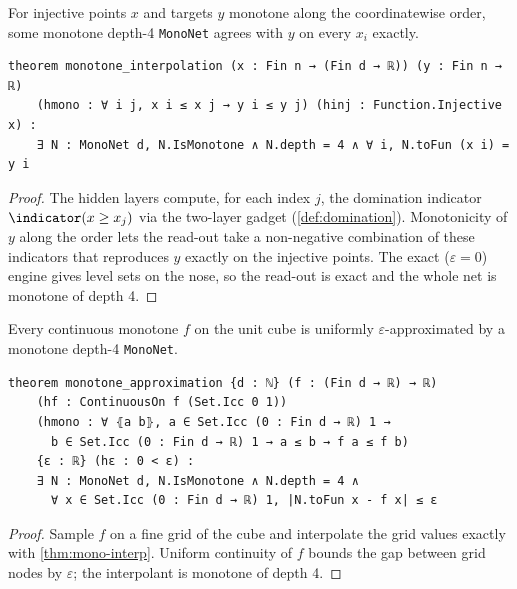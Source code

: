 \begin{theorem}\label{thm:mono-interp}
  \leanok
  For injective points $x$ and targets $y$ monotone along the coordinatewise order, some monotone
  depth-4 \texttt{MonoNet} agrees with $y$ on every $x_i$ exactly.
\end{theorem}
\begin{verbatim}
theorem monotone_interpolation (x : Fin n → (Fin d → ℝ)) (y : Fin n → ℝ)
    (hmono : ∀ i j, x i ≤ x j → y i ≤ y j) (hinj : Function.Injective x) :
    ∃ N : MonoNet d, N.IsMonotone ∧ N.depth = 4 ∧ ∀ i, N.toFun (x i) = y i
\end{verbatim}
\begin{proof}\leanok
  The hidden layers compute, for each index $j$, the domination indicator
  $\indicator(x\ge x_j)$ via the two-layer gadget (\cref{def:domination}). Monotonicity of $y$
  along the order lets the read-out take a non-negative combination of these indicators that
  reproduces $y$ exactly on the injective points. The exact ($\varepsilon=0$) engine gives level
  sets on the nose, so the read-out is exact and the whole net is monotone of depth 4.
\end{proof}

\begin{theorem}\label{thm:mono-approx}
  \leanok
  Every continuous monotone $f$ on the unit cube is uniformly $\varepsilon$-approximated by a
  monotone depth-4 \texttt{MonoNet}.
\end{theorem}
\begin{verbatim}
theorem monotone_approximation {d : ℕ} (f : (Fin d → ℝ) → ℝ)
    (hf : ContinuousOn f (Set.Icc 0 1))
    (hmono : ∀ ⦃a b⦄, a ∈ Set.Icc (0 : Fin d → ℝ) 1 →
      b ∈ Set.Icc (0 : Fin d → ℝ) 1 → a ≤ b → f a ≤ f b)
    {ε : ℝ} (hε : 0 < ε) :
    ∃ N : MonoNet d, N.IsMonotone ∧ N.depth = 4 ∧
      ∀ x ∈ Set.Icc (0 : Fin d → ℝ) 1, |N.toFun x - f x| ≤ ε
\end{verbatim}
\begin{proof}\leanok
  Sample $f$ on a fine grid of the cube and interpolate the grid values exactly with
  \cref{thm:mono-interp}. Uniform continuity of $f$ bounds the gap between grid nodes by
  $\varepsilon$; the interpolant is monotone of depth 4.
\end{proof}

